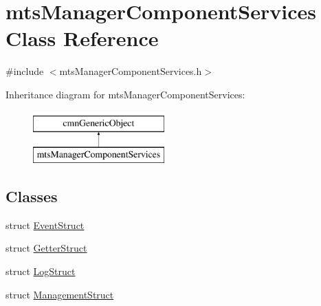 \hypertarget{classmts_manager_component_services}{\section{mts\-Manager\-Component\-Services Class Reference}
\label{classmts_manager_component_services}
}


{\ttfamily \#include $<$mts\-Manager\-Component\-Services.\-h$>$}

Inheritance diagram for mts\-Manager\-Component\-Services\-:\begin{figure}[H]
\begin{center}
\leavevmode
\includegraphics[height=2.000000cm]{db/dc6/classmts_manager_component_services}
\end{center}
\end{figure}
\subsection*{Classes}
\begin{DoxyCompactItemize}
\item 
struct \hyperlink{structmts_manager_component_services_1_1_event_struct}{Event\-Struct}
\item 
struct \hyperlink{structmts_manager_component_services_1_1_getter_struct}{Getter\-Struct}
\item 
struct \hyperlink{structmts_manager_component_services_1_1_log_struct}{Log\-Struct}
\item 
struct \hyperlink{structmts_manager_component_services_1_1_management_struct}{Management\-Struct}
\end{DoxyCompactItemize}

